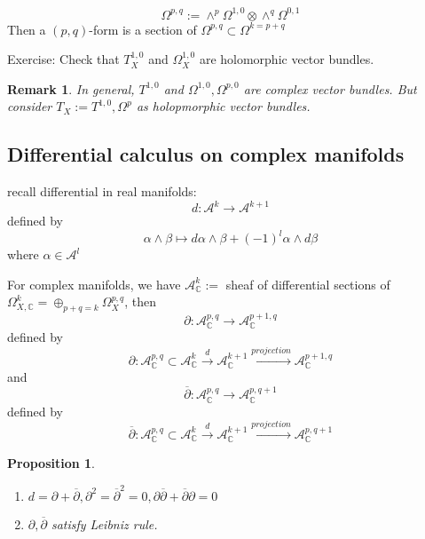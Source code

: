 \documentclass{article}
\newtheorem{proposition}[definition]{Proposition}
\newtheorem{remark}[definition]{Remark}
\begin{document}
\[\Omega^{p,q}:=\wedge^{p}\Omega^{1,0}\otimes \wedge^{q}\Omega^{0,1}\]
Then a $(p,q)$-form is a section of $\Omega^{p,q} \subset \Omega^{k=p+q}$

Exercise: Check that $T^{1,0}_{X}$ and $\Omega^{1,0}_{X}$ are holomorphic vector bundles. 

\begin{remark}
  In general, $T^{1,0}$ and $\Omega^{1,0},\Omega^{p,0}$ are complex vector bundles. But consider $T_{X}:=T^{1,0},\Omega^{p}$ as holopmorphic vector bundles.
\end{remark}
\subsection{Differential calculus on complex manifolds}
recall differential in real manifolds:
\[
  d:\mathcal{A}^{k}\to \mathcal{A}^{k+1}
\]
defined by
\[
  \alpha \wedge \beta \mapsto d\alpha \wedge \beta + (-1)^{l}\alpha \wedge d\beta
\]
where $\alpha \in \mathcal{A}^{l}$

For complex manifolds, we have $\mathcal{A}_{\mathbb{C}}^{k}:=$ sheaf of differential sections of $\Omega^{k}_{X,\mathbb{C}}=\oplus_{p+q=k}\Omega_{X}^{p,q}$, then
\[
  \partial:\mathcal{A}_{\mathbb{C}}^{p,q}\to \mathcal{A}_{\mathbb{C}}^{p+1,q}
\]
defined by
\[
  \partial:\mathcal{A}_{\mathbb{C}}^{p,q} \subset \mathcal{A}_{\mathbb{C}}^{k} \xrightarrow{d} \mathcal{A}_{\mathbb{C}}^{k+1}\xrightarrow{projection}\mathcal{A}_{\mathbb{C}}^{p+1,q}
\]
and
\[
  \overline{\partial}:\mathcal{A}_{\mathbb{C}}^{p,q}\to \mathcal{A}_{\mathbb{C}}^{p,q+1}
\]
defined by
\[
  \overline{\partial}:\mathcal{A}_{\mathbb{C}}^{p,q} \subset \mathcal{A}_{\mathbb{C}}^{k} \xrightarrow{d} \mathcal{A}_{\mathbb{C}}^{k+1}\xrightarrow{projection}\mathcal{A}_{\mathbb{C}}^{p,q+1}
\]
\begin{proposition}
  \begin{enumerate}
    \item $d=\partial + \overline{\partial}, \partial^{2}= \overline{\partial}^{2}=0,\partial \overline{\partial}+ \overline{\partial}\partial=0$
    \item $\partial, \overline{\partial}$ satisfy Leibniz rule.
  \end{enumerate}
\end{proposition}
\end{document}
